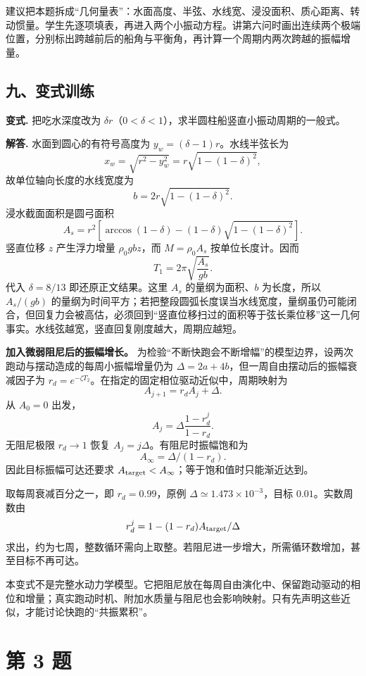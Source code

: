 \documentclass[12pt,a4paper,UTF8]{ctexart}
\begin{document}
建议把本题拆成``几何量表''：水面高度、半弦、水线宽、浸没面积、质心距离、转动惯量。学生先逐项填表，再进入两个小振动方程。讲第六问时画出连续两个极端位置，分别标出跨越前后的船角与平衡角，再计算一个周期内两次跨越的振幅增量。

\subsection{九、变式训练}\label{ux4e5dux53d8ux5f0fux8badux7ec3-1}

\textbf{变式.} 把吃水深度改为
\(\delta r\)（\(0<\delta<1\)），求半圆柱船竖直小振动周期的一般式。

\textbf{解答.} 水面到圆心的有符号高度为
\(y_w=(\delta-1)r\)。水线半弦长为 \[
x_w=\sqrt{r^2-y_w^2}
=r\sqrt{1-(1-\delta)^2},
\] 故单位轴向长度的水线宽度为 \[
b=2r\sqrt{1-(1-\delta)^2}.
\] 浸水截面面积是圆弓面积 \[
A_s=r^2\left[
\arccos(1-\delta)-(1-\delta)
\sqrt{1-(1-\delta)^2}
\right].
\] 竖直位移 \(z\) 产生浮力增量 \(\rho_0gbz\)，而 \(M=\rho_0A_s\)
按单位长度计。因而 \[
\boxed{T_1=2\pi\sqrt{\frac{A_s}{gb}}}.
\] 代入 \(\delta=8/13\) 即还原正文结果。这里 \(A_s\) 的量纲为面积、\(b\)
为长度，所以 \(A_s/(gb)\)
的量纲为时间平方；若把整段圆弧长度误当水线宽度，量纲虽仍可能闭合，但回复力会被高估，必须回到``竖直位移扫过的面积等于弦长乘位移''这一几何事实。水线弦越宽，竖直回复刚度越大，周期应越短。

\textbf{加入微弱阻尼后的振幅增长。}
为检验``不断快跑会不断增幅''的模型边界，设两次跑动与摆动造成的每周小振幅增量仍为
\(\Delta=2a+4b\)，但一周自由摆动后的振幅衰减因子为
\(r_d=e^{-\zeta T_2}\)。在指定的固定相位驱动近似中，周期映射为 \[
A_{j+1}=r_dA_j+\Delta.
\] 从 \(A_0=0\) 出发， \[
A_j=\Delta\frac{1-r_d^j}{1-r_d}.
\] 无阻尼极限 \(r_d\to1\) 恢复 \(A_j=j\Delta\)。有阻尼时振幅饱和为 \[
A_\infty=\Delta/(1-r_d).
\] 因此目标振幅可达还要求
\(A_{\rm target}<A_\infty\)；等于饱和值时只能渐近达到。

取每周衰减百分之一，即 \(r_d=0.99\)，原例
\(\Delta\simeq1.473\times10^{-3}\)，目标 \(0.01\)。实数周数由 \[
r_d^j=1-(1-r_d)A_{\rm target}/\Delta
\]
求出，约为七周，整数循环需向上取整。若阻尼进一步增大，所需循环数增加，甚至目标不再可达。

本变式不是完整水动力学模型。它把阻尼放在每周自由演化中、保留跑动驱动的相位和增量；真实跑动时机、附加水质量与阻尼也会影响映射。只有先声明这些近似，才能讨论快跑的``共振累积''。

\newpage

\section{第 3 题}\label{ux7b2c-3-ux9898}
\end{document}
